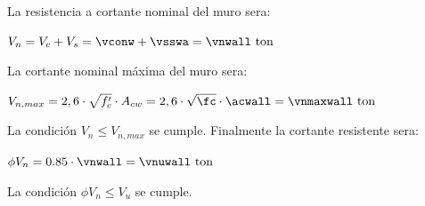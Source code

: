La resistencia a cortante nominal del muro sera:
\begin{center}
    $\displaystyle V_{n}=V_{c}+V_{s}=\vconw+\vsswa=\vnwall\mathrm{~ton}$
\end{center}
La cortante nominal máxima del muro sera:
\begin{center}
    $\displaystyle V_{n,max} =2,6 \cdot \sqrt{f_{c}^{\prime}} \cdot A_{c w}=2,6 \cdot \sqrt{\fc} \cdot \acwall=\vnmaxwall\mathrm{~ton}$
\end{center}
La condición $V_{n}\leq V_{n,max}$ se cumple.
Finalmente la cortante resistente sera:
\begin{center}
    $\displaystyle \phi V_{n}=0.85\cdot\vnwall= \vnuwall\mathrm{~ton}$
\end{center}
La condición $\phi V_{n}\leq V_{u}$ se cumple.